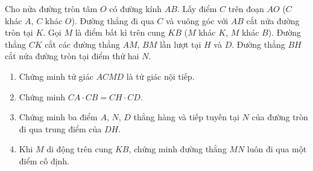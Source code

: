 \begin{ex}%
	Cho nửa đường tròn tâm $O$ có đường kính $AB$. Lấy điểm $C$ trên đoạn $AO$ ($C$ khác $A$, $C$ khác $O$). Đường thẳng đi qua $C$ và vuông góc với $AB$ cắt nửa đường tròn tại $K$. Gọi $M$ là điểm bất kì trên cung $KB$ ($M$ khác $K$, $M$ khác $B$). Đường thẳng $CK$ cắt các đường thẳng $AM$, $BM$ lần lượt tại $H$ và $D$. Đường thẳng $BH$ cắt nửa đường tròn tại điểm thứ hai $N$.
	\begin{enumerate}
		\item Chứng minh tứ giác $ACMD$ là tứ giác nội tiếp.
		\item Chứng minh $CA \cdot CB=CH \cdot CD$.
		\item Chứng minh ba điểm $A$, $N$, $D$ thẳng hàng và tiếp tuyến tại $N$ của đường tròn đi qua trung điểm của $DH$.
		\item Khi $M$ di động trên cung $KB$, chứng minh đường thẳng $MN$ luôn đi qua một điểm cố định.
	\end{enumerate}
\end{ex}

